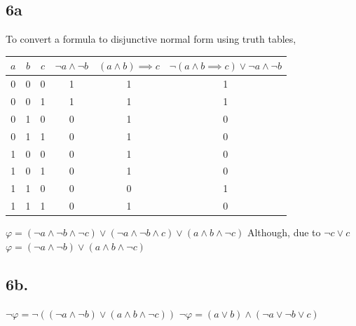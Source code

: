 \documentclass{article}
\begin{document}
	\subsection*{6a}
	To convert a formula to disjunctive normal form using truth tables, 
	\begin{center}
	\begin{tabular}{ |c|c|c|c|c|c| } 
 	\hline
 	 $ a $ & $ b$ & $c$ & $ \neg a\land \neg b $ & $( a \land b) \implies c $ & $\neg( a\land b \implies c )\lor \neg a \land \neg b $ \\ 
	\hline
	0&0&0&1&1&1 \\
	\hline
	0&0&1&1&1&1\\
	\hline
	0&1&0&0&1&0 \\
	\hline
	0&1&1&0&1&0 \\
	\hline
	1&0&0&0&1&0 \\
	\hline
	1&0&1&0&1&0 \\
	\hline
	1&1&0&0&0&1 \\
	\hline
	1&1&1&0&1&0 \\
	\hline
	\end{tabular}
	\end{center}
	
	$\varphi = (\neg a \land \neg b \land \neg c)  \lor (\neg a \land \neg b \land c) \lor (a \land b \land \neg c)$
	\newline
	Although, due to $\neg c \lor c $
	\newline
	$\varphi = (\neg a \land \neg b) \lor (a \land b \land \neg c)$

	\subsection*{6b.}
	$ \neg \varphi = \neg( (\neg a \land \neg b) \lor (a \land b \land \neg c))$
	\newline
	$\neg \varphi = (a \lor b) \land (\neg a \lor \neg b \lor c)$
	
\end{document}
